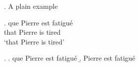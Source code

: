

\ex. A plain example\exannot{[XP]}

\ex. \gll que Pierre est fatigu\'e \exannot{[CP]}\\
     that Pierre is tired\\
\glt `that Pierre is tired'

\ex.
\a. que Pierre est fatigu\'e\exannot{[CP]}
\b. Pierre est fatigu\'e

